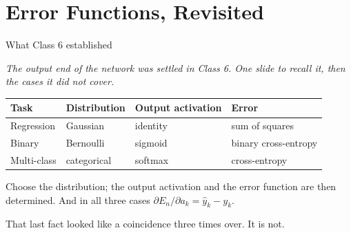 \documentclass[aspectratio=169, 11pt]{beamer}
\newcommand{\bridge}[1]{%
  {\scriptsize\itshape\color{mcMuted} #1\par}\vspace{0.35em}}
\newcommand{\nosrc}{}       %
\begin{document}
\section{Error Functions, Revisited}

\begin{frame}{What Class 6 established}
  \nosrc
  \bridge{The output end of the network was settled in Class 6. One
  slide to recall it, then the cases it did not cover.}
  \vspace{0.3em}
  \centering
  \renewcommand{\arraystretch}{1.3}
  {\small
  \begin{tabular}{p{} p{}
                  p{} p{}}
    \textbf{Task} & \textbf{Distribution} &
    \textbf{Output activation} & \textbf{Error}\\
    \hline
    Regression & Gaussian & identity & sum of squares\\
    Binary & Bernoulli & sigmoid & binary cross-entropy\\
    Multi-class & categorical & softmax & cross-entropy\\
    \hline
  \end{tabular}}
  \vspace{0.6em}

  {\small Choose the distribution; the output activation and the error
  function are then \alert{determined}. And in all three cases
  $\partial E_n/\partial a_k = \hat y_k - y_k$.}
  \vspace{0.3em}

  {\small That last fact looked like a coincidence three times over.
  It is not.}
\end{frame}
\end{document}
